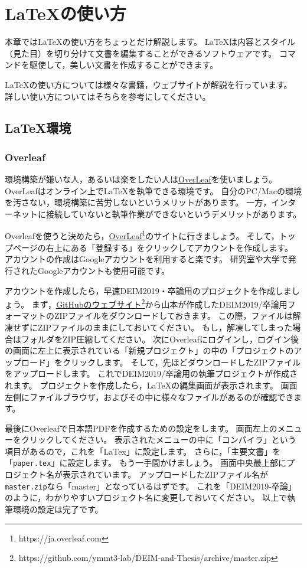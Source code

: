 \section{LaTeXの使い方}
本章ではLaTeXの使い方をちょっとだけ解説します。
LaTeXは内容とスタイル（見た目）を切り分けて文書を編集することができるソフトウェアです。
コマンドを駆使して，美しい文書を作成することができます。

LaTeXの使い方については様々な書籍，ウェブサイトが解説を行っています。
詳しい使い方についてはそちらを参考にしてください。


\subsection{LaTeX環境}
\subsubsection{Overleaf}
環境構築が嫌いな人，あるいは楽をしたい人は\href{https://ja.overleaf.com}{OverLeaf}を使いましょう。
OverLeafはオンライン上でLaTeXを執筆できる環境です。
自分のPC/Macの環境を汚さない，環境構築に苦労しないというメリットがあります。
一方，インターネットに接続していないと執筆作業ができないというデメリットがあります。

Overleafを使うと決めたら，\href{https://ja.overleaf.com}{OverLeaf}\footnote{https://ja.overleaf.com}のサイトに行きましょう。
そして，トップページの右上にある「登録する」をクリックしてアカウントを作成します。
アカウントの作成はGoogleアカウントを利用すると楽です。
研究室や大学で発行されたGoogleアカウントも使用可能です。

アカウントを作成したら，早速DEIM2019・卒論用のプロジェクトを作成しましょう。
まず，\href{https://github.com/ymmt3-lab/DEIM-and-Thesis/archive/master.zip}{GitHubのウェブサイト}\footnote{https://github.com/ymmt3-lab/DEIM-and-Thesis/archive/master.zip}から山本が作成したDEIM2019/卒論用フォーマットのZIPファイルをダウンロードしておきます。
この際，ファイルは解凍せずにZIPファイルのままにしておいてください。
もし，解凍してしまった場合はフォルダをZIP圧縮してください。
次にOverleafにログインし，ログイン後の画面に左上に表示されている「新規プロジェクト」の中の「プロジェクトのアップロード」をクリックします。
そして，先ほどダウンロードしたZIPファイルをアップロードします。
これでDEIM2019/卒論用の執筆プロジェクトが作成されます。
プロジェクトを作成したら，LaTeXの編集画面が表示されます。
画面左側にファイルブラウザ，およびその中に様々なファイルがあるのが確認できます。

最後にOverleafで日本語PDFを作成するための設定をします。
画面左上のメニューをクリックしてください。
表示されたメニューの中に「コンパイラ」という項目があるので，これを「LaTex」に設定します。
さらに，「主要文書」を「\texttt{paper.tex}」に設定します。
もう一手間かけましょう。
画面中央最上部にプロジェクト名が表示されています。
アップロードしたZIPファイル名が\texttt{master.zip}なら「master」となっているはずです。
これを「DEIM2019-卒論」のように，わかりやすいプロジェクト名に変更しておいてください。
以上で執筆環境の設定は完了です。

